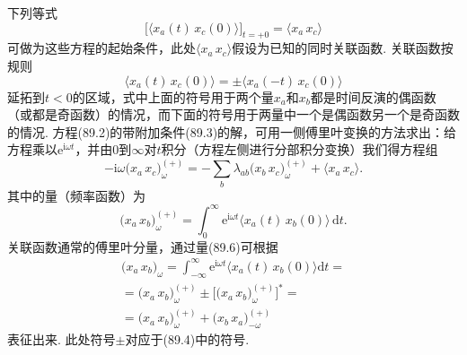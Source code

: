 下列等式
\begin{equation}
\bigl[\bigl\langle x_{a}(t)\,x_{c}(0)\bigr\rangle\bigr]_{t=+0}=\langle x_{a}\,x_{c}\rangle
\end{equation}
可做为这些方程的起始条件，此处$\langle x_{a}\,x_{c}\rangle$假设为已知的同时关联函数. 关联函数按规则
\begin{equation}
\bigl\langle x_{a}(t)\,x_{c}(0)\bigr\rangle=\pm\bigl\langle x_{a}(-t)\,x_{c}(0)\bigr\rangle
\end{equation}
延拓到$t<0$的区域，式中上面的符号用于两个量$x_{a}$和$x_{b}$都是时间反演的偶函数（或都是奇函数）的情况，而下面的符号用于两量中一个是偶函数另一个是奇函数的情况. 方程(89.2)的带附加条件(89.3)的解，可用一侧傅里叶变换的方法求出：给方程乘以$\mathrm{e}^{\mathrm{i}\omega t}$，并由0到$\infty$对$t$积分（方程左侧进行分部积分变换）我们得方程组
\begin{equation}
-\mathrm{i}\omega\bigl(x_{a}\,x_{c}\bigr)^{(+)}_{\omega}=-\sum_{b}\lambda_{ab}\bigl(x_{b}\,x_{c}\bigr)^{(+)}_{\omega}+\langle x_{a}\,x_{c}\rangle.
\end{equation}
其中的量（频率函数）为
\begin{equation}
\bigl(x_{a}\,x_{b}\bigr)^{(+)}_{\omega}=\int_{0}^{\infty}\mathrm{e}^{\mathrm{i}\omega t}\bigl\langle x_{a}(t)\,x_{b}(0)\bigr\rangle\,\mathrm{d}t.
\end{equation}
关联函数通常的傅里叶分量，通过量(89.6)可根据
\begin{equation}
\begin{split}
\bigl(x_{a}\,x_{b}\bigr)_{\omega}=\int_{-\infty}^{\infty}\mathrm{e}^{\mathrm{i}\omega t}\bigl\langle x_{a}(t)\,x_{b}(0)\bigr\rangle\mathrm{d}t=\\
=\bigl(x_{a}\,x_{b}\bigr)^{(+)}_{\omega}\pm\bigl[\bigl(x_{a}\,x_{b}\bigr)^{(+)}_{\omega}\bigr]^{*}=\\
=\bigl(x_{a}\,x_{b}\bigr)^{(+)}_{\omega}+\bigl(x_{b}\,x_{a}\bigr)^{(+)}_{-\omega}
\end{split}
\end{equation}
表征出来. 此处符号$\pm$对应于(89.4)中的符号.

